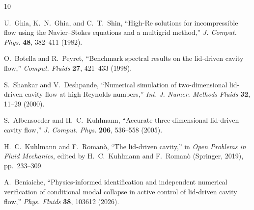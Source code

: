 \documentclass[11pt,a4paper]{article}
\begin{document}
\newpage


\begin{thebibliography}{10}

U.~Ghia, K.~N.~Ghia, and C.~T.~Shin,
``High-{Re} solutions for incompressible flow using the {Navier--Stokes}
equations and a multigrid method,''
\textit{J. Comput. Phys.} \textbf{48}, 382--411 (1982).

O.~Botella and R.~Peyret,
``Benchmark spectral results on the lid-driven cavity flow,''
\textit{Comput. Fluids} \textbf{27}, 421--433 (1998).

S.~Shankar and V.~Deshpande,
``Numerical simulation of two-dimensional lid-driven cavity flow at high
{Reynolds} numbers,''
\textit{Int. J. Numer. Methods Fluids} \textbf{32}, 11--29 (2000).

S.~Albensoeder and H.~C.~Kuhlmann,
``Accurate three-dimensional lid-driven cavity flow,''
\textit{J. Comput. Phys.} \textbf{206}, 536--558 (2005).

H.~C.~Kuhlmann and F.~Romanò,
``The lid-driven cavity,''
in \textit{Open Problems in Fluid Mechanics}, edited by H.~C.~Kuhlmann and
F.~Romanò (Springer, 2019), pp.~233--309.

A.~Beniaiche,
``Physics-informed identification and independent numerical verification of
conditional modal collapse in active control of lid-driven cavity flow,''
\textit{Phys. Fluids} \textbf{38}, 103612 (2026).

\end{thebibliography}
\end{document}

